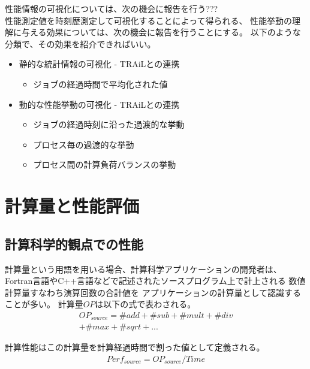 \documentclass[submit,techrep,noauthor]{ipsj}
\begin{document}
{ \color{blue}
性能情報の可視化については、次の機会に報告を行う???\\

性能測定値を時刻歴測定して可視化することによって得られる、
性能挙動の理解に与える効果については、次の機会に報告を行うことにする。
以下のような分類で、その効果を紹介できればいい。
\begin{itemize}
\item 静的な統計情報の可視化 - TRAiLとの連携
	\begin{itemize}
	\item ジョブの経過時間で平均化された値
	\end{itemize}
\item 動的な性能挙動の可視化 - TRAiLとの連携
	\begin{itemize}
	\item ジョブの経過時刻に沿った過渡的な挙動
	\item プロセス毎の過渡的な挙動
	\item プロセス間の計算負荷バランスの挙動
	\end{itemize}
\end{itemize}
}




\section {計算量と性能評価}

\subsection {計算科学的観点での性能}
\label{subsection:scientific-perf}
計算量という用語を用いる場合、計算科学アプリケーションの開発者は、
Fortran言語やC++言語などで記述されたソースプログラム上で計上される
数値計算量すなわち演算回数の合計値を
アプリケーションの計算量として認識することが多い。
計算量\begin{math} OP \end{math}は以下の式で表わされる。
\begin{align*}
OP_{source} = \#add + \#sub + \#mult + \#div \\
	+ \#max + \#sqrt + ...
\end{align*}

計算性能はこの計算量を計算経過時間で割った値として定義される。
\begin{align*}
Perf_{source} = OP_{source} / Time	%
\end{align*}
\end{document}
